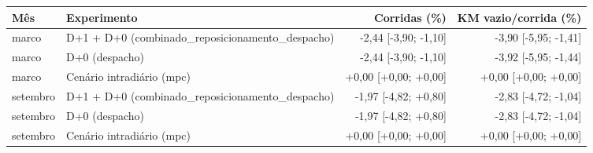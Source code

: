 \begin{tabular}{llrr}
\hline
Mês & Experimento & Corridas (\%) & KM vazio/corrida (\%) \\
\hline
marco & D+1 + D+0 (combinado_reposicionamento_despacho) & -2{,}44 [-3{,}90; -1{,}10] & -3{,}90 [-5{,}95; -1{,}41] \\
marco & D+0 (despacho) & -2{,}44 [-3{,}90; -1{,}10] & -3{,}92 [-5{,}95; -1{,}44] \\
marco & Cenário intradiário (mpc) & +0{,}00 [+0{,}00; +0{,}00] & +0{,}00 [+0{,}00; +0{,}00] \\
setembro & D+1 + D+0 (combinado_reposicionamento_despacho) & -1{,}97 [-4{,}82; +0{,}80] & -2{,}83 [-4{,}72; -1{,}04] \\
setembro & D+0 (despacho) & -1{,}97 [-4{,}82; +0{,}80] & -2{,}83 [-4{,}72; -1{,}04] \\
setembro & Cenário intradiário (mpc) & +0{,}00 [+0{,}00; +0{,}00] & +0{,}00 [+0{,}00; +0{,}00] \\
\hline
\end{tabular}
